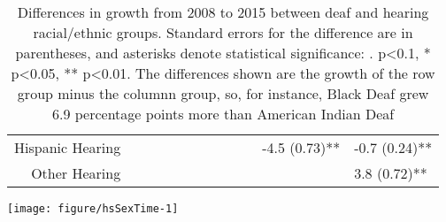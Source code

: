 \documentclass{article}\usepackage[]{graphicx}\usepackage[]{color}
\makeatletter
\def\maxwidth{ %
  \ifdim\Gin@nat@width>\linewidth
    \linewidth
  \else
    \Gin@nat@width
  \fi
}
\newenvironment{knitrout}{}{} %
\makeatother
\begin{document}
\begin{landscape}
\begin{table}[ht]
\begin{tabular}{rlllllllllll}
  Hispanic Hearing &  &  &  &  &  &  &  &  &  & -4.5 (0.73)** & -0.7 (0.24)** \\
  Other Hearing &  &  &  &  &  &  &  &  &  &  & 3.8 (0.72)** \\
   \hline
\end{tabular}
\endgroup
\caption{Differences in growth from 2008 to 2015 between deaf and hearing racial/ethnic
groups. Standard errors for the difference are in parentheses, and asterisks denote statistical significance: . p<0.1, * p<0.05, ** p<0.01. The differences shown are the growth of the row group minus the columnn group, so, for instance, Black Deaf grew 6.9 percentage points more than American Indian Deaf}
\label{tab:bachRaceGrowth}
\end{table}

\end{landscape}


\clearpage
\begin{center}
\begin{knitrout}
\color{fgcolor}
\texttt{[image: figure/hsSexTime-1]}

\end{knitrout}
\end{center}
\end{document}
